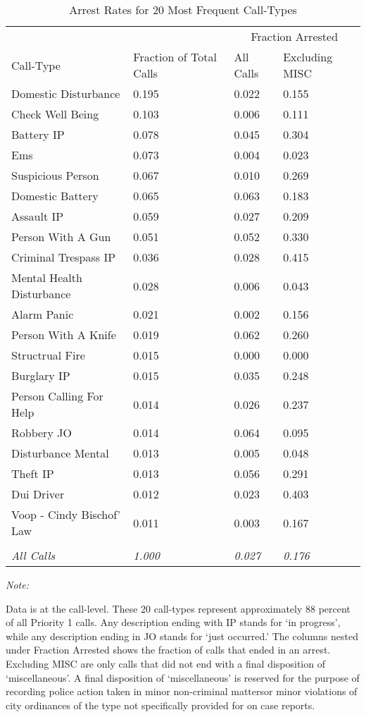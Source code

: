 \begin{table}
\centering
\caption{\label{referee_arrest_rates}Arrest Rates for 20 Most Frequent Call-Types}
\centering
\begin{threeparttable}
\begin{tabular}[t]{llll}
\toprule
\multicolumn{2}{c}{ } & \multicolumn{2}{c}{Fraction Arrested} \\
\cmidrule(l{3pt}r{3pt}){3-4}
Call-Type & Fraction of Total Calls & All Calls & Excluding MISC\\
\midrule
Domestic Disturbance & 0.195 & 0.022 & 0.155\\
Check Well Being & 0.103 & 0.006 & 0.111\\
Battery IP & 0.078 & 0.045 & 0.304\\
Ems & 0.073 & 0.004 & 0.023\\
Suspicious Person & 0.067 & 0.010 & 0.269\\
\addlinespace
Domestic Battery & 0.065 & 0.063 & 0.183\\
Assault IP & 0.059 & 0.027 & 0.209\\
Person With A Gun & 0.051 & 0.052 & 0.330\\
Criminal Trespass IP & 0.036 & 0.028 & 0.415\\
Mental Health Disturbance & 0.028 & 0.006 & 0.043\\
\addlinespace
Alarm Panic & 0.021 & 0.002 & 0.156\\
Person With A Knife & 0.019 & 0.062 & 0.260\\
Structrual Fire & 0.015 & 0.000 & 0.000\\
Burglary IP & 0.015 & 0.035 & 0.248\\
Person Calling For Help & 0.014 & 0.026 & 0.237\\
\addlinespace
Robbery JO & 0.014 & 0.064 & 0.095\\
Disturbance Mental & 0.013 & 0.005 & 0.048\\
Theft IP & 0.013 & 0.056 & 0.291\\
Dui Driver & 0.012 & 0.023 & 0.403\\
Voop - Cindy Bischof' Law & 0.011 & 0.003 & 0.167\\
\midrule\\
\addlinespace
\em{All Calls} & \em{1.000} & \em{0.027} & \em{0.176}\\
\bottomrule
\end{tabular}
\begin{tablenotes}
\item \textit{Note: } 
\item Data is at         the call-level. These 20 call-types represent approximately 88 percent of all Priority 1 calls.         Any description         ending with IP stands for `in progress', while any description ending in JO          stands for `just occurred.' The columns nested under Fraction Arrested shows the          fraction of calls that ended in an arrest. Excluding MISC are only calls          that did not end with a final disposition of `miscellaneous'. A final disposition of         `miscellaneous' is reserved for the purpose of recording police action taken in minor non-criminal mattersor minor violations of city ordinances of the type not specifically provided for on case reports.                  

\end{tablenotes}
\end{threeparttable}
\end{table}
